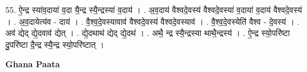 \documentclass[17pt]{extarticle}
\begin{document}
55. ऐ॒न्द्र स्या॑व॒दाया॑ व॒दा यै॒न्द्र स्यै॒न्द्रस्या॑ व॒दाय॑ । . अ॒व॒दाय॑ वैश्वदे॒वस्य॑ वैश्वदे॒वस्या॑ व॒दाया॑ व॒दाय॑ वैश्वदे॒वस्य॑ । . अ॒व॒दायेत्य॑व - दाय॑ । . वै॒श्व॒दे॒वस्यावाव॑ वैश्वदे॒वस्य॑ वैश्वदे॒वस्याव॑ । . वै॒श्व॒दे॒वस्येति॑ वैश्व - दे॒वस्य॑ । . अव॑ द्येद् द्ये॒दवाव॑ द्येत् । . द्ये॒दथाथ॑ द्येद् द्ये॒दथ॑ । . अथै॒ न्द्र स्यै॒न्द्रस्या थाथै॒न्द्रस्य॑ । . ऐ॒न्द्र स्यो॒परि॑ष्टा दु॒परि॑ष्टा दै॒न्द्र स्यै॒न्द्र स्यो॒परि॑ष्टात् । \newline

\textbf{Ghana Paata } \newline
\end{document}
